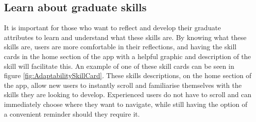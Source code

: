\documentclass{l4proj}
\begin{document}
\subsection{Learn about graduate skills}

It is important for those who want to reflect and develop their graduate attributes to learn and understand what these skills are. By knowing what these skills are, users are more comfortable in their reflections, and having the skill cards in the home section of the app with a helpful graphic and description of the skill will facilitate this. An example of one of these skill cards can be seen in figure \ref{fig:AdaptabilitySkillCard}. These skills descriptions, on the home section of the app, allow new users to instantly scroll and familiarise themselves with the skills they are looking to develop. Experienced users do not have to scroll and can immediately choose where they want to navigate, while still having the option of a convenient reminder should they require it. 
\end{document}
